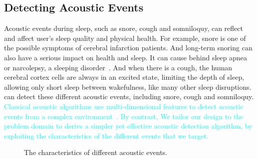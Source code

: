 \subsection{Detecting Acoustic Events \label{sec:acoustic}}
Acoustic events during sleep, such as snore, cough and somniloquy, can reflect and affect user's sleep quality and physical health. For
example, snore is one of the possible symptoms of cerebral infarction patients.  And long-term snoring can also have a serious impact on
health and sleep. It can cause behind sleep apnea or narcolepsy, a sleeping disorder~\cite{snoring2016,snoring2013}. And when there is a
cough, the human cerebral cortex cells are always in an excited state, limiting the depth of sleep, allowing only short sleep between
wakefulness, like many other sleep disruptions. {\systemname} can detect these different acoustic events, including snore, cough and
somniloquy. \textcolor{cyan}{ Classical acoustic algorithms use multi-dimensional features to detect acoustic events from a complex
environment~\cite{gu2016sleep}. By contrast, We tailor our design to the problem domain to derive a simpler yet effective acoustic
detection algorithm, by exploiting the characteristics of the different events that we target.}

\begin{figure}[!t]
\centering
\caption{The characteristics of different acoustic events.}\label{acoustic}
\end{figure}



